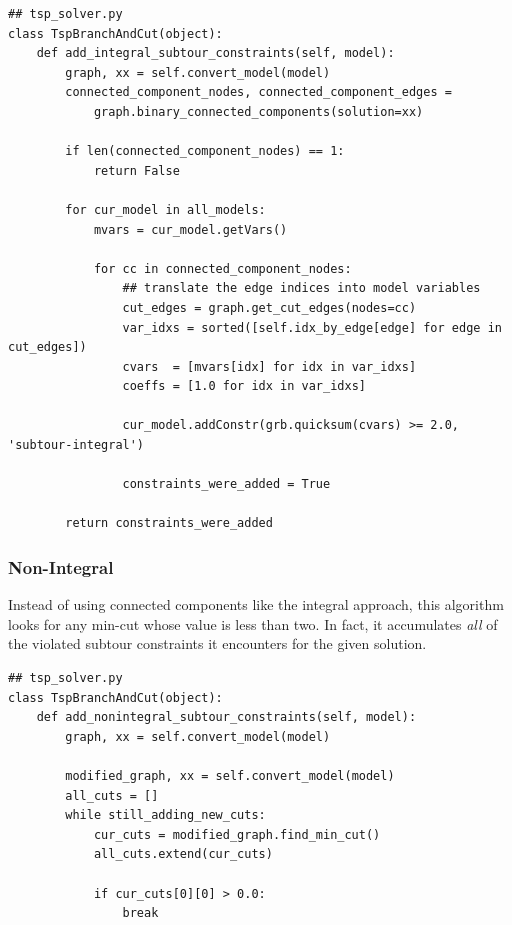 \documentclass{article}
\begin{document}
\begin{flushleft}
\begin{flushleft}
\begin{flushleft}
\begin{lstlisting}
## tsp_solver.py
class TspBranchAndCut(object):
    def add_integral_subtour_constraints(self, model):
        graph, xx = self.convert_model(model)
        connected_component_nodes, connected_component_edges =
            graph.binary_connected_components(solution=xx)

        if len(connected_component_nodes) == 1:
            return False

        for cur_model in all_models:
            mvars = cur_model.getVars()

            for cc in connected_component_nodes:
                ## translate the edge indices into model variables
                cut_edges = graph.get_cut_edges(nodes=cc)
                var_idxs = sorted([self.idx_by_edge[edge] for edge in cut_edges])
                cvars  = [mvars[idx] for idx in var_idxs]
                coeffs = [1.0 for idx in var_idxs]

                cur_model.addConstr(grb.quicksum(cvars) >= 2.0, 'subtour-integral')

                constraints_were_added = True

        return constraints_were_added
\end{lstlisting}

\end{flushleft}

\subsubsection{Non-Integral}

\begin{flushleft}

Instead of using connected components
like the integral approach,
this algorithm looks
for any min-cut
whose value is less than two.
In fact,
it accumulates \textit{all}
of the violated subtour constraints
it encounters for the given solution.

\begin{lstlisting}
## tsp_solver.py
class TspBranchAndCut(object):
    def add_nonintegral_subtour_constraints(self, model):
        graph, xx = self.convert_model(model)

        modified_graph, xx = self.convert_model(model)
        all_cuts = []
        while still_adding_new_cuts:
            cur_cuts = modified_graph.find_min_cut()
            all_cuts.extend(cur_cuts)

            if cur_cuts[0][0] > 0.0:
                break


\end{lstlisting}
\end{flushleft}
\end{flushleft}
\end{flushleft}
\end{document}
